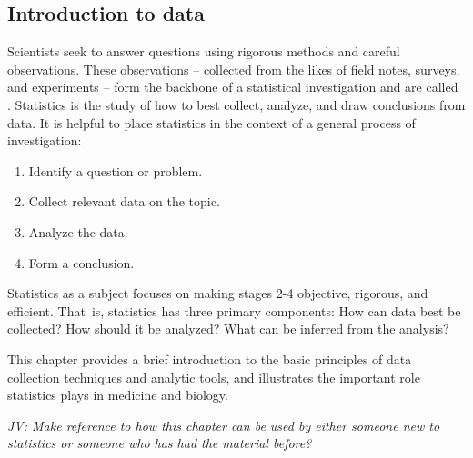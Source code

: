 \begin{doublespace}

\chapter{Introduction to data}
\label{introductionToData}

Scientists seek to answer questions using rigorous methods and careful observations. These observations -- collected from the likes of field notes, surveys, and experiments -- form the backbone of a statistical investigation and are called . Statistics is the study of how to best collect, analyze, and draw conclusions from data. It is helpful to place statistics in the context of a general process of investigation:
\begin{enumerate}
\setlength{\itemsep}{0mm}
\item Identify a question or problem.
\item Collect relevant data on the topic.
\item Analyze the data.
\item Form a conclusion.
\end{enumerate}
Statistics as a subject focuses on making stages 2-4 objective, rigorous, and efficient. That~is, statistics has three primary components: How can data best be collected? How should it be analyzed? What can be inferred from the analysis?  

This chapter provides a brief introduction to the basic principles of data collection techniques and analytic tools, and illustrates the important role statistics plays in medicine and biology.

\textit{JV: Make reference to how this chapter can be used by either someone new to statistics or someone who has had the material before?}


\end{doublespace}
